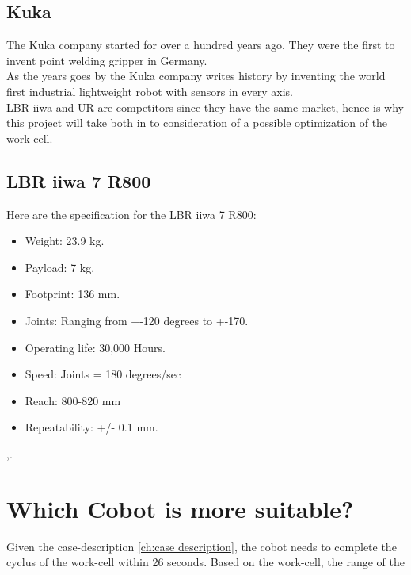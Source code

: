 \subsection{Kuka}

The Kuka company started for over a hundred years ago. They were the first to invent point welding gripper in Germany.\\
As the years goes by the Kuka company writes history by inventing the world first industrial lightweight robot with sensors in every axis.\\

LBR iiwa and UR are competitors since they have the same market, hence is why this project will take both in to consideration of a possible optimization of the work-cell\cite{KukaHist}.\\


\subsection{LBR iiwa 7 R800}

Here are the specification for the LBR iiwa 7 R800:\\

\begin{itemize}
    \item Weight: 23.9 kg.
    \item Payload: 7 kg.
    \item Footprint: 136 mm.
    \item Joints: Ranging from +-120 degrees to +-170.
    \item Operating life: 30,000 Hours.
    \item Speed: Joints = 180 degrees/sec
    \item Reach: 800-820 mm
    \item Repeatability: +/- 0.1 mm.
\end{itemize}
\cite{KukaSpec1},\cite{KukaSpec2}.

\section{Which Cobot is more suitable?}

Given the case-description \ref{ch:case description}, the cobot needs to complete the cyclus of the work-cell within 26 seconds. Based on the work-cell, the range of the 